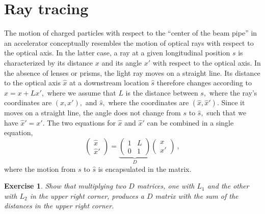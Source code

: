 \documentclass{article}
\newtheorem{exercise}{Exercise}
\begin{document}
%
\section{Ray tracing}
%
The motion of charged particles with respect to the ``center of the beam pipe'' in
an accelerator conceptually resembles the motion of optical rays with respect 
to the optical axis. In the latter case, a ray at a given longitudinal position 
$s$ is characterized by its distance
$x$ and its angle $x'$ with respect to the optical axis. In the absence of 
lenses or prisms, the light ray moves on a straight line. Its distance to the optical axis $\hat x$ at
a downstream location $\hat s$ therefore changes according to $\hat x=x+Lx',$
where we assume that $L$ is the distance between $s,$ where the ray's
coordinates are $(x, x'),$ and $\hat s,$ where the coordinates are $(\hat x, \hat x').$ 
Since it moves on a straight line, the angle does not change from $s$ to 
$\hat s,$ such that we have $\hat x'=x'.$ The two equations for $\hat x$ 
and $\hat x'$ can be combined in a single equation,
\begin{equation}\label{eq:drift}
\left(\begin{array}{c} \hat  x\\ \hat x'\end{array}\right)
=\underbrace{\left(\begin{array}{cc} 1 &L\\ 0 & 1\end{array}\right)}_{D}
\left(\begin{array}{c} x\\x'\end{array}\right)\ ,
\end{equation}
where the motion from $s$ to $\hat s$ is encapsulated in the matrix. 

\begin{exercise}
Show that multiplying two $D$ matrices, one with $L_1$ and the other with $L_2$ in the upper right corner, produces a $D$ matrix with the sum of the distances in the upper right corner.
\end{exercise}
\end{document}
